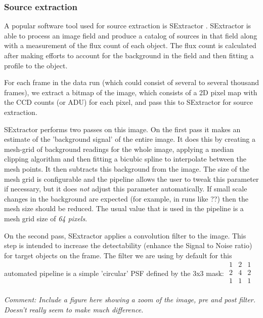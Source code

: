 \subsubsection{Source extraction}
A popular software tool used for source extraction is SExtractor \cite{bertin}. SExtractor is able to process an image field and produce a catalog of sources in that field along with a measurement of the flux count of each object. The flux count is calculated after making efforts to account for the background in the field and then fitting a profile to the object. 

For each frame in the data run (which could consist of several to several thousand frames), we extract a bitmap of the image, which consists of a 2D pixel map with the CCD counts (or ADU) for each pixel, and pass this to SExtractor for source extraction. 

SExtractor performs two passes on this image. On the first pass it makes an estimate of the 'background signal' of the entire image. It does this by creating a mesh-grid of background readings for the whole image, applying a median clipping algorithm and then fitting a bicubic spline to interpolate between the mesh points. It then subtracts this background from the image. The size of the mesh grid is configurable and the pipeline allows the user to tweak this parameter if necessary, but it does \emph{not} adjust this parameter automatically. If small scale changes in the background are expected (for example, in runs like ??) then the mesh size should be reduced. The usual value that is used in the pipeline is a mesh grid size of \emph{64 pixels}.

On the second pass, SExtractor applies a convolution filter to the image. This step is intended to increase the detectability (enhance the Signal to Noise ratio) for target objects on the frame. The filter we are using by default for this automated pipeline is a simple 'circular' PSF defined by the 3x3 mask:
$
\begin{array}{ccc}
  1 & 2 & 1 \\
  2 & 4 & 2 \\
  1 & 1 & 1 \\
\end{array}  
$

\emph{Comment: Include a figure here showing a zoom of the image, pre and post filter. Doesn't really seem to make much difference.} 


